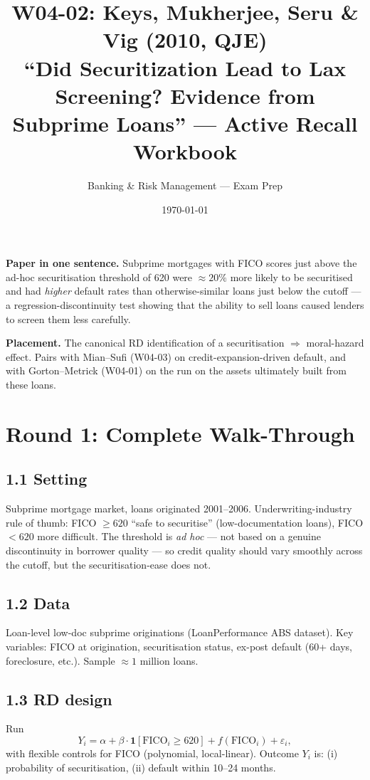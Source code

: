 \documentclass[11pt]{article}
\title{W04-02: Keys, Mukherjee, Seru \& Vig (2010, QJE) \\
\large ``Did Securitization Lead to Lax Screening? Evidence from Subprime Loans'' --- Active Recall Workbook}
\author{Banking \& Risk Management --- Exam Prep}
\date{\today}
\begin{document}
\maketitle

\begin{keybox}
\textbf{Paper in one sentence.} Subprime mortgages with FICO scores just above the ad-hoc securitisation threshold of 620 were $\approx 20\%$ more likely to be securitised and had \emph{higher} default rates than otherwise-similar loans just below the cutoff --- a regression-discontinuity test showing that the ability to sell loans caused lenders to screen them less carefully.

\textbf{Placement.} The canonical RD identification of a securitisation $\Rightarrow$ moral-hazard effect. Pairs with Mian--Sufi (W04-03) on credit-expansion-driven default, and with Gorton--Metrick (W04-01) on the run on the assets ultimately built from these loans.
\end{keybox}

\section*{Round 1: Complete Walk-Through}

\subsection*{1.1 Setting}
Subprime mortgage market, loans originated 2001--2006. Underwriting-industry rule of thumb: FICO $\geq 620$ ``safe to securitise'' (low-documentation loans), FICO $< 620$ more difficult. The threshold is \emph{ad hoc} --- not based on a genuine discontinuity in borrower quality --- so credit quality should vary smoothly across the cutoff, but the securitisation-ease does not.

\subsection*{1.2 Data}
Loan-level low-doc subprime originations (LoanPerformance ABS dataset). Key variables: FICO at origination, securitisation status, ex-post default (60+ days, foreclosure, etc.). Sample $\approx 1$ million loans.

\subsection*{1.3 RD design}
Run
\[
Y_i = \alpha + \beta\cdot\mathbf{1}[\text{FICO}_i\geq 620]+ f(\text{FICO}_i)+\varepsilon_i,
\]
with flexible controls for FICO (polynomial, local-linear). Outcome $Y_i$ is: (i) probability of securitisation, (ii) default within 10--24 months.
\end{document}
